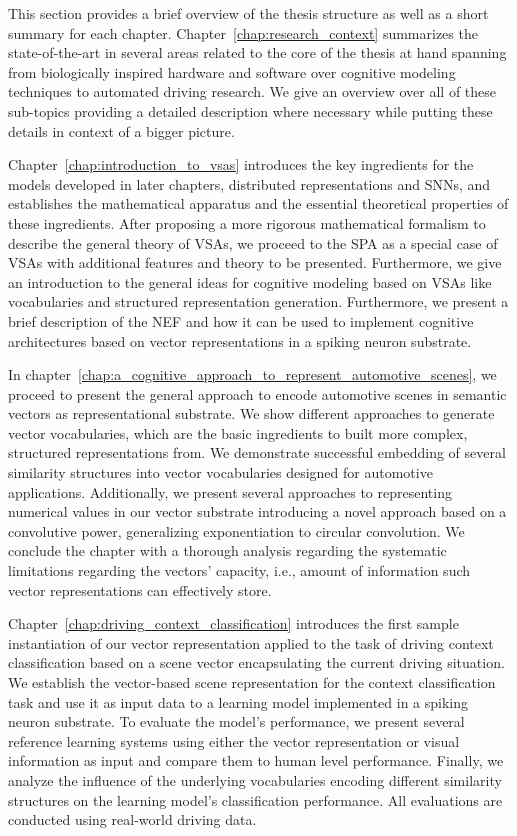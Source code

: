 This section provides a brief overview of the thesis structure as well as a short summary for each chapter.
Chapter~\ref{chap:research_context} summarizes the state-of-the-art in several areas related to the core of the thesis at hand spanning from biologically inspired hardware and software over cognitive modeling techniques to automated driving research.
We give an overview over all of these sub-topics providing a detailed description where necessary while putting these details in context of a bigger picture.

Chapter~\ref{chap:introduction_to_vsas} introduces the key ingredients for the models developed in later chapters, distributed representations and \acp{SNN}, and establishes the mathematical apparatus and the essential theoretical properties of these ingredients.
After proposing a more rigorous mathematical formalism to describe the general theory of \acp{VSA}, we proceed to the \ac{SPA} as a special case of \acp{VSA} with additional features and theory to be presented.
Furthermore, we give an introduction to the general ideas for cognitive modeling based on \acp{VSA} like vocabularies and structured representation generation.
Furthermore, we present a brief description of the \ac{NEF} and how it can be used to implement cognitive architectures based on vector representations in a spiking neuron substrate.

In chapter~\ref{chap:a_cognitive_approach_to_represent_automotive_scenes}, we proceed to present the general approach to encode automotive scenes in semantic vectors as representational substrate.
We show different approaches to generate vector vocabularies, which are the basic ingredients to built more complex, structured representations from.
We demonstrate successful embedding of several similarity structures into vector vocabularies designed for automotive applications.
Additionally, we present several approaches to representing numerical values in our vector substrate introducing a novel approach based on a convolutive power, generalizing exponentiation to circular convolution.
We conclude the chapter with a thorough analysis regarding the systematic limitations regarding the vectors' capacity, i.e., amount of information such vector representations can effectively store.

Chapter~\ref{chap:driving_context_classification} introduces the first sample instantiation of our vector representation applied to the task of driving context classification based on a scene vector encapsulating the current driving situation.
We establish the vector-based scene representation for the context classification task and use it as input data to a learning model implemented in a spiking neuron substrate.
To evaluate the model's performance, we present several reference learning systems using either the vector representation or visual information as input and compare them to human level performance.
Finally, we analyze the influence of the underlying vocabularies encoding different similarity structures on the learning model's classification performance.
All evaluations are conducted using real-world driving data.

